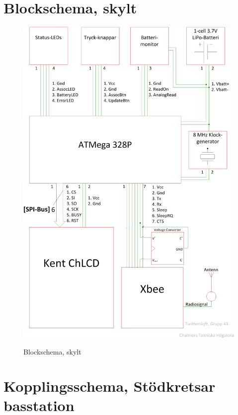 \documentclass[a4paper,11pt]{article}
\begin{document}
\section{Blockschema, skylt}

\begin{figure}[H]
\includegraphics[scale=0.6, angle=0]{block_skylt.png}
\label{fig:block_skylt}
\caption{Blockschema, skylt}
\end{figure}
\pagebreak

\section{Kopplingsschema, Stödkretsar basstation}
\end{document}
